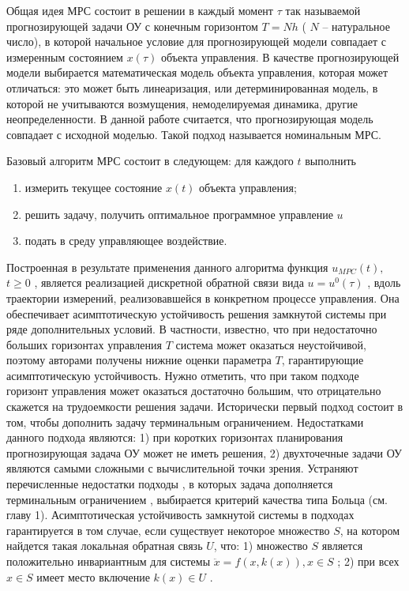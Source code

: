 Общая идея МРС состоит в решении в каждый момент $\tau$ так называемой прогнозирующей задачи ОУ с конечным горизонтом $T = Nh$ ( $N$ – натуральное число), в которой начальное условие для прогнозирующей модели совпадает с измеренным состоянием $x(\tau)$ объекта управления. В качестве прогнозирующей модели выбирается математическая модель объекта управления, которая может отличаться: это может быть линеаризация,
или детерминированная модель, в которой не учитываются возмущения, немоделируемая динамика, другие неопределенности.  В данной работе считается, что прогнозирующая модель совпадает с исходной моделью. Такой подход называется номинальным МРС. 

Базовый алгоритм МРС состоит в следующем: для каждого $t$ выполнить
\begin{enumerate}
	\item измерить текущее состояние $x(t)$ объекта управления;
	\item решить задачу, получить оптимальное программное управление $u$
	\item подать в среду управляющее воздействие.
\end{enumerate}

Построенная в результате применения данного алгоритма функция 
$u_{MPC} (t),$  $ t \ge 0$ , является реализацией дискретной обратной связи вида $u = u^0(\tau)$ , вдоль траектории измерений, реализовавшейся в конкретном процессе управления.  Она обеспечивает асимптотическую устойчивость решения замкнутой системы при ряде дополнительных условий. В частности, известно, что при недостаточно больших горизонтах управления $T$ система может оказаться неустойчивой, поэтому авторами \cite{mpcIn2} получены нижние оценки параметра $T$, гарантирующие асимптотическую устойчивость. Нужно отметить,
что при таком подходе горизонт управления может оказаться достаточно большим, что отрицательно скажется на трудоемкости решения задачи. Исторически первый подход состоит в том, чтобы дополнить задачу  терминальным ограничением. Недостатками данного подхода являются: 1) при коротких горизонтах планирования прогнозирующая задача ОУ может не иметь решения, 2) двухточечные задачи ОУ являются самыми сложными с вычислительной точки зрения. Устраняют перечисленные недостатки подходы \cite{mpcIn2}, в которых задача дополняется
терминальным ограничением , выбирается критерий качества типа Больца (см. главу 1). Асимптотическая устойчивость замкнутой системы в подходах \cite{mpcIn2} гарантируется в том случае, если существует некоторое множество $S$, на котором найдется такая локальная обратная связь $U$, что: 1) множество $S$ является положительно инвариантным для системы $\ddot{x} =  f (x, k (x)), x \in S$ ; 2) при всех $x \in S$ имеет место включение $k(x) \in U$ .


